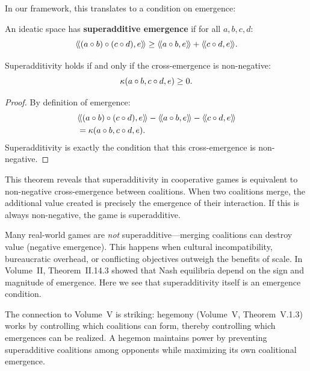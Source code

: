 In our framework, this translates to a condition on emergence:

\begin{definition}
\label{def:superadditive-emergence}
An ideatic space has \textbf{superadditive emergence} if for all $a, b, c, d$:
\[
  \langle\!\langle (a \circ b) \circ (c \circ d), e \rangle\!\rangle \geq
  \langle\!\langle a \circ b, e \rangle\!\rangle + \langle\!\langle c \circ d, e \rangle\!\rangle.
\]
\end{definition}

\begin{theorem}
\label{thm:emergence-superadditivity}
Superadditivity holds if and only if the cross-emergence is non-negative:
\[
  \kappa(a \circ b, c \circ d, e) \geq 0.
\]
\end{theorem}

\begin{proof}
By definition of emergence:
\begin{align*}
  &\langle\!\langle (a \circ b) \circ (c \circ d), e \rangle\!\rangle
  - \langle\!\langle a \circ b, e \rangle\!\rangle - \langle\!\langle c \circ d, e \rangle\!\rangle \\
  &= \kappa(a \circ b, c \circ d, e).
\end{align*}
Superadditivity is exactly the condition that this cross-emergence is non-negative.
\end{proof}

\begin{interpretation}
This theorem reveals that superadditivity in cooperative games is equivalent
to non-negative cross-emergence between coalitions. When two coalitions merge,
the additional value created is precisely the emergence of their interaction.
If this is always non-negative, the game is superadditive.

Many real-world games are \emph{not} superadditive---merging coalitions can
destroy value (negative emergence). This happens when cultural incompatibility,
bureaucratic overhead, or conflicting objectives outweigh the benefits of scale.
In Volume~II, Theorem~II.14.3 showed that Nash equilibria depend on the sign
and magnitude of emergence. Here we see that superadditivity itself is an
emergence condition.

The connection to Volume~V is striking: hegemony (Volume~V, Theorem~V.1.3)
works by controlling which coalitions can form, thereby controlling which
emergences can be realized. A hegemon maintains power by preventing
superadditive coalitions among opponents while maximizing its own coalitional
emergence.
\end{interpretation}

